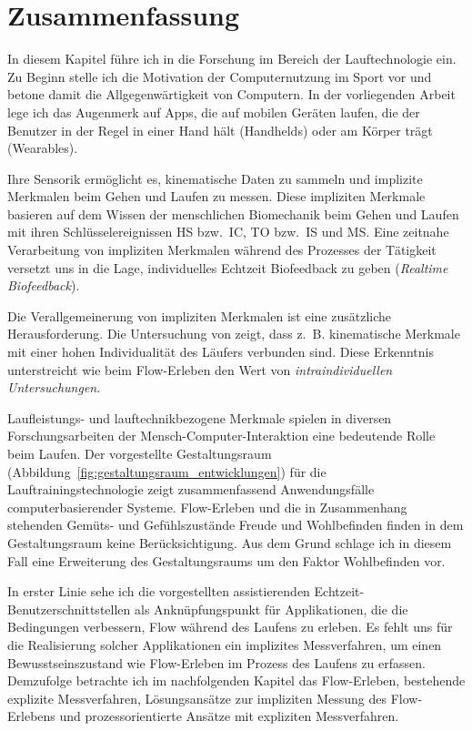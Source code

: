 

\section{Zusammenfassung} 

\label{sec:zusammenfassung_2}

In diesem Kapitel führe ich in die Forschung im Bereich der Lauftechnologie ein. Zu Beginn stelle ich die Motivation der Computernutzung im Sport vor und betone damit die Allgegenwärtigkeit von Computern. In der vorliegenden Arbeit lege ich das Augenmerk auf Apps, die auf mobilen Geräten laufen, die der Benutzer in der Regel in einer Hand hält (Handhelds) oder am Körper trägt (Wearables).

Ihre Sensorik ermöglicht es, kinematische Daten zu sammeln und implizite Merkmalen beim Gehen und Laufen zu messen. Diese impliziten Merkmale basieren auf dem Wissen der menschlichen Biomechanik beim Gehen und Laufen mit ihren Schlüsselereignissen \ac{HS} bzw.\ \ac{IC}, \ac{TO} bzw.\ \ac{IS} und \ac{MS}. Eine zeitnahe Verarbeitung von impliziten Merkmalen während des Prozesses der Tätigkeit versetzt uns in die Lage, individuelles Echtzeit Biofeedback zu geben (\emph{Realtime Biofeedback}). 

Die Verallgemeinerung von impliziten Merkmalen ist eine zusätzliche Herausforderung. Die Untersuchung von \citet{Strohrmann2012} zeigt, dass z.~B. kinematische Merkmale mit einer hohen Individualität des Läufers verbunden sind. Diese Erkenntnis unterstreicht wie beim Flow-Erleben den Wert von \emph{intraindividuellen Untersuchungen}.

Laufleistungs- und lauftechnikbezogene Merkmale spielen in diversen Forschungsarbeiten der Mensch-Computer-Interaktion eine bedeutende Rolle beim Laufen. Der vorgestellte Gestaltungsraum (Abbildung~\ref{fig:gestaltungsraum_entwicklungen}) für die Lauftrainingstechnologie zeigt zusammenfassend Anwendungsfälle computerbasierender Systeme. Flow-Erleben und die in Zusammenhang stehenden Gemüts- und Gefühlszustände Freude und Wohlbefinden finden in dem Gestaltungsraum keine Berücksichtigung. Aus dem Grund schlage ich in diesem Fall eine Erweiterung des Gestaltungsraums um den Faktor Wohlbefinden vor.

In erster Linie sehe ich die vorgestellten assistierenden Echtzeit-Benutzerschnittstellen als Anknüpfungspunkt für Applikationen, die die Bedingungen verbessern, Flow während des Laufens zu erleben. Es fehlt uns für die Realisierung solcher Applikationen ein implizites Messverfahren, um einen Bewusstseinszustand wie Flow-Erleben im Prozess des Laufens zu erfassen. Demzufolge betrachte ich im nachfolgenden Kapitel das Flow-Erleben, bestehende explizite Messverfahren, Lösungsansätze zur impliziten Messung des Flow-Erlebens und prozessorientierte Ansätze mit expliziten Messverfahren.

